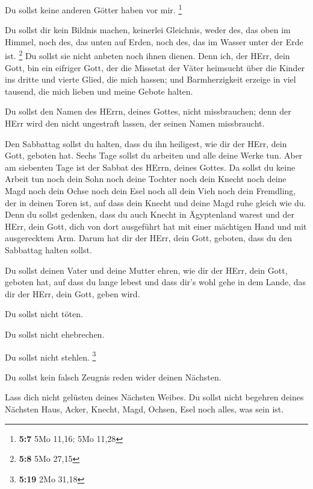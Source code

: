  Du sollst keine anderen Götter haben vor mir. \footnote{\textbf{5:7}
  5Mo 11,16; 5Mo 11,28}

 Du sollst dir kein Bildnis machen, keinerlei Gleichnis,
weder des, das oben im Himmel, noch des, das unten auf Erden, noch des,
das im Wasser unter der Erde ist. \footnote{\textbf{5:8} 5Mo 27,15}
 Du sollst sie nicht anbeten noch ihnen dienen. Denn ich,
der HErr, dein Gott, bin ein eifriger Gott, der die Missetat der Väter
heimsucht über die Kinder ins dritte und vierte Glied, die mich hassen;
 und Barmherzigkeit erzeige in viel tausend, die mich
lieben und meine Gebote halten.

 Du sollst den Namen des HErrn, deines Gottes, nicht
missbrauchen; denn der HErr wird den nicht ungestraft lassen, der seinen
Namen missbraucht.

 Den Sabbattag sollst du halten, dass du ihn heiligest, wie
dir der HErr, dein Gott, geboten hat.  Sechs Tage sollst du
arbeiten und alle deine Werke tun.  Aber am siebenten Tage
ist der Sabbat des HErrn, deines Gottes. Da sollst du keine Arbeit tun
noch dein Sohn noch deine Tochter noch dein Knecht noch deine Magd noch
dein Ochse noch dein Esel noch all dein Vieh noch dein Fremdling, der in
deinen Toren ist, auf dass dein Knecht und deine Magd ruhe gleich wie
du.  Denn du sollst gedenken, dass du auch Knecht in
Ägyptenland warest und der HErr, dein Gott, dich von dort ausgeführt hat
mit einer mächtigen Hand und mit ausgerecktem Arm. Darum hat dir der
HErr, dein Gott, geboten, dass du den Sabbattag halten sollst.

 Du sollst deinen Vater und deine Mutter ehren, wie dir der
HErr, dein Gott, geboten hat, auf dass du lange lebest und dass dir's
wohl gehe in dem Lande, das dir der HErr, dein Gott, geben wird.

 Du sollst nicht töten.

 Du sollst nicht ehebrechen.

 Du sollst nicht stehlen. \footnote{\textbf{5:19} 2Mo 31,18}

 Du sollst kein falsch Zeugnis reden wider deinen Nächsten.

 Lass dich nicht gelüsten deines Nächsten Weibes. Du sollst
nicht begehren deines Nächsten Haus, Acker, Knecht, Magd, Ochsen, Esel
noch alles, was sein ist.

